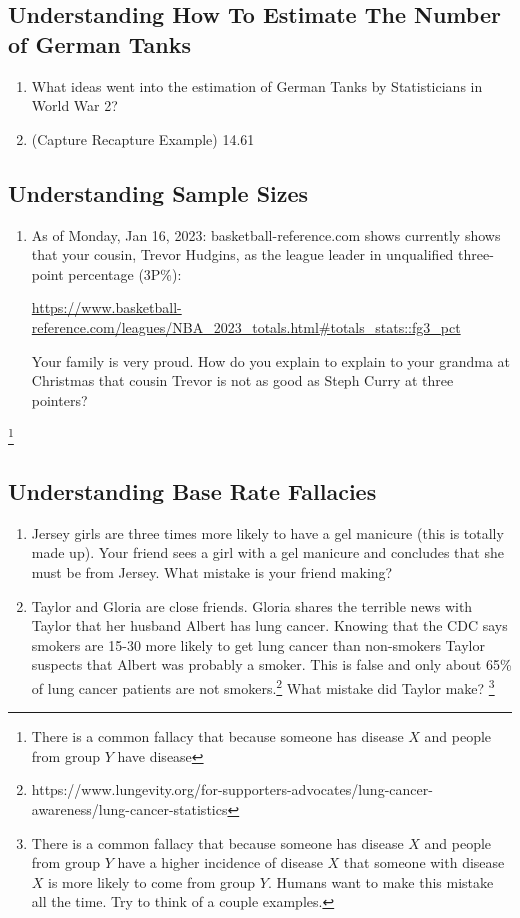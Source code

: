 \documentclass[11pt, letterpaper]{article}
\begin{document}
\subsection{Understanding How To Estimate The Number of German Tanks}
\begin{enumerate}
	\item What ideas went into the estimation of German Tanks by Statisticians in World War 2?
    \item (Capture Recapture Example) 14.61
\end{enumerate}

\subsection{Understanding Sample Sizes}
\begin{enumerate}
    \item 
    As of Monday, Jan 16, 2023: basketball-reference.com shows currently shows that your cousin, Trevor Hudgins, as the league leader in unqualified three-point percentage (3P\%): 
    \begin{center} \url{https://www.basketball-reference.com/leagues/NBA_2023_totals.html#totals_stats::fg3_pct}
    \end{center}
    Your family is very proud. How do you explain to explain to your grandma at Christmas that cousin Trevor is not as good as Steph Curry at three pointers? 
\end{enumerate}\footnote{
There is a common fallacy that because someone has disease $X$ and people from group $Y$ have disease 
}

\subsection{Understanding Base Rate Fallacies}
\begin{enumerate}
    \item Jersey girls are three times more likely to have a gel manicure (this is totally made up). Your friend sees a girl with a gel manicure and concludes that she must be from Jersey. What mistake is your friend making?
    
    \item Taylor and Gloria are close friends. Gloria shares the terrible news with Taylor  that her husband Albert has lung cancer. Knowing that the CDC says smokers are 15-30 more likely to get lung cancer than non-smokers Taylor suspects that Albert was probably a smoker. This is false and only about 65\% of lung cancer patients are not smokers.\footnote{https://www.lungevity.org/for-supporters-advocates/lung-cancer-awareness/lung-cancer-statistics} What mistake did Taylor make?
    \footnote{
    	There is a common fallacy that because someone has disease $X$ and people from group $Y$ have a higher incidence of disease $X$ that someone with disease $X$ is more likely to come from group $Y$. 
    	Humans want to make this mistake all the time. 
    	Try to think of a couple examples. 
    }
\end{enumerate}
\end{document}

